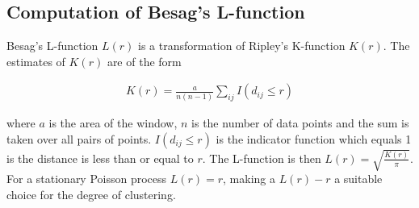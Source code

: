 \documentclass{ucetd}
\begin{document}
\subsection{Computation of Besag's L-function}

Besag's L-function $L(r)$ is a transformation of Ripley's K-function $K(r)$. The estimates of $K(r)$ are of the form 

\begin{align*}
K(r) = \frac{a}{n(n-1)}\sum_{ij} I(d_{ij}\leq r)
\end{align*}

where $a$ is the area of the window, $n$ is the number of data points and the sum is taken over all pairs of points. $I(d_{ij}\leq r)$ is the indicator function which equals 1 is the distance is less than or equal to $r$. The L-function is then $L(r) = \sqrt{\frac{K(r)}{\pi}}$. For a stationary Poisson process $L(r) = r$, making a $L(r)-r$ a suitable choice for the degree of clustering.





\end{document}
